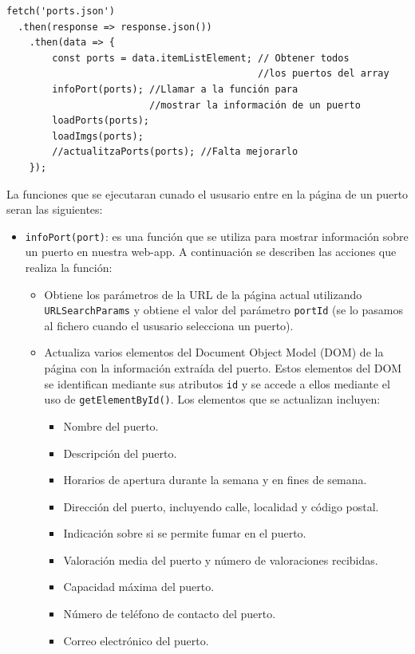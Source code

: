 \documentclass{article}
\begin{document}
\begin{verbatim}
fetch('ports.json')
  .then(response => response.json())
    .then(data => {
        const ports = data.itemListElement; // Obtener todos 
                                            //los puertos del array
        infoPort(ports); //Llamar a la función para 
                         //mostrar la información de un puerto
        loadPorts(ports);
        loadImgs(ports); 
        //actualitzaPorts(ports); //Falta mejorarlo
    });
\end{verbatim} 
La funciones que se ejecutaran cunado el ususario entre en la página de un puerto seran las siguientes:
\begin{itemize}
    \item \texttt{infoPort(port)}: es una función que se utiliza para mostrar información sobre un puerto en nuestra web-app. A continuación se describen las acciones que realiza la función:
    \begin{itemize}
        \item Obtiene los parámetros de la URL de la página actual utilizando \texttt{URLSearchParams} y obtiene el valor del parámetro \texttt{portId} (se lo pasamos al fichero cuando el ususario selecciona un puerto).
        \item Actualiza varios elementos del Document Object Model (DOM) de la página con la información extraída del puerto. Estos elementos del DOM se identifican mediante sus atributos \texttt{id} y se accede a ellos mediante el uso de \texttt{getElementById()}. Los elementos que se actualizan incluyen:
        \begin{itemize}
            \item Nombre del puerto.
            \item Descripción del puerto.
            \item Horarios de apertura durante la semana y en fines de semana.
            \item Dirección del puerto, incluyendo calle, localidad y código postal.
            \item Indicación sobre si se permite fumar en el puerto.
            \item Valoración media del puerto y número de valoraciones recibidas.
            \item Capacidad máxima del puerto.
            \item Número de teléfono de contacto del puerto.
            \item Correo electrónico del puerto.

\end{itemize}
\end{itemize}
\end{itemize}
\end{document}
